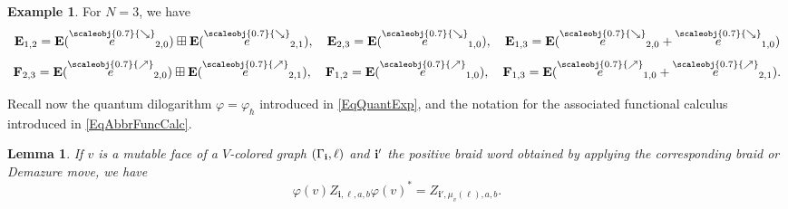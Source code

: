 \documentclass[11pt, reqno]{amsart}
\newtheorem{lemma}[theorem]{Lemma}
\theoremstyle{definition}
\newtheorem{example}[theorem]{Example}
\numberwithin{equation}{section}
\newcommand{\nears}{\scaleobj{0.7}{\nearrow}}
\newcommand{\sears}{\scaleobj{0.7}{\searrow}}
\newcommand{\nee}{\overset{\nears}{e}}
\newcommand{\seee}{\overset{\sears}{e}}
\def\Ebf{\mathbf{E}}
\def\stgE{\mathbf{E}}
\def\stgF{\mathbf{F}}
\begin{document}
\begin{example}
For $N=3$, we have
$$
\stgE_{1,2} = \Ebf(\seee_{2,0})\boxplus  \Ebf(\seee_{2,1}),\quad \stgE_{2,3} =  \Ebf(\seee_{1,0}),\quad \stgE_{1,3} = \Ebf(\seee_{2,0}+\seee_{1,0})
$$
$$
\stgF_{2,3} =  \Ebf(\nee_{2,0}) \boxplus  \Ebf(\nee_{2,1}),\quad \stgF_{1,2} = \Ebf(\nee_{1,0}) ,\quad \stgF_{1,3} = \Ebf(\nee_{1,0}+\nee_{2,1}).
$$
\end{example}

Recall now the quantum dilogarithm $\varphi = \varphi_{\hbar}$ introduced in \eqref{EqQuantExp}, and the notation for the associated functional calculus introduced in \eqref{EqAbbrFuncCalc}. 
\begin{lemma}
\label{lem:Zmut}
If $v$ is a mutable face of a $V$-colored graph $(\Gamma_{\bf i},\ell)$ and $\bf i'$ the positive braid word obtained by applying the corresponding braid or Demazure move, we have 
$$
\varphi(v)Z_{\mathbf{i},\ell,a,b}\varphi(v)^* = Z_{\mathbf{i}',\mu_v(\ell),a,b}.
$$
\end{lemma} 
\end{document}
